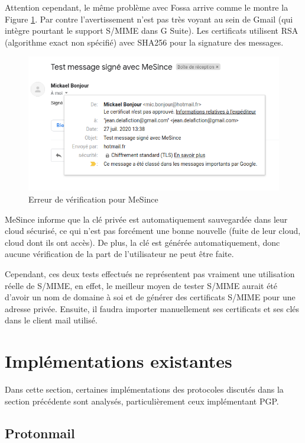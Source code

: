 Attention cependant, le même problème avec Fossa arrive comme le montre la Figure \ref{fig:SMIME_MeSinceProblem}. Par contre l'avertissement n'est pas très voyant au sein de Gmail (qui intègre pourtant le support S/MIME dans G Suite). Les certificats utilisent RSA (algorithme exact non spécifié) avec SHA256 pour la signature des messages.

\begin{figure}[h!]
	\includegraphics[width=15cm]{images/mesince_problem.png}
	\centering
	\caption{Erreur de vérification pour MeSince}
	\label{fig:SMIME_MeSinceProblem}
\end{figure}

MeSince informe que la clé privée est automatiquement sauvegardée dans leur cloud sécurisé, ce qui n'est pas forcément une bonne nouvelle (fuite de leur cloud, cloud dont ils ont accès). De plus, la clé est générée automatiquement, donc aucune vérification de la part de l'utilisateur ne peut être faite.

Cependant, ces deux tests effectués ne représentent pas vraiment une utilisation réelle de S/MIME, en effet, le meilleur moyen de tester S/MIME aurait été d'avoir un nom de domaine à soi et de générer des certificats S/MIME pour une adresse privée. Ensuite, il faudra importer manuellement ses certificats et ses clés dans le client mail utilisé.

\section{Implémentations existantes}
Dans cette section, certaines implémentations des protocoles discutés dans la section précédente sont analysés, particulièrement ceux implémentant PGP.

\subsection{Protonmail}

